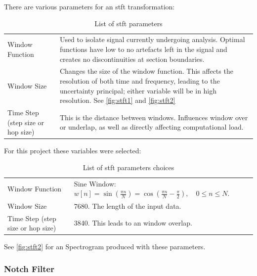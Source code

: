 \documentclass[12pt]{article}
\begin{document}
There are various parameters for an \acrshort{stft} transformation: 
\begin{table}[H]
\centering
\begin{tabular}{p{}p{}}
Window Function & Used to isolate signal currently undergoing analysis. Optimal functions have low to no artefacts left in the signal and creates no discontinuities at section boundaries.\\
Window Size & Changes the size of the window function. This affects the resolution of both time and frequency, leading to the uncertainty principal; either variable will be in high resolution. See \ref{fig:stft1} and \ref{fig:stft2} \\
Time Step (step size or hop size) & This is the distance between windows. Influences window over or underlap, as well as directly affecting computational load. \\                            
\end{tabular}
\caption{List of \acrfull{stft} parameters}
\label{tab:stft_params}
\end{table}

For this project these variables were selected:

\begin{table}[H]
\centering
\begin{tabular}{p{}p{}}
Window Function & Sine Window: $ w[n] = \sin\left(\frac{\pi n}{N}\right) = \cos\left(\frac{\pi n}{N} - \frac{\pi}{2}\right),\quad 0\le n \le N.$ \\
Window Size & 7680. The length of the input data. \\
Time Step (step size or hop size) & 3840. This leads to an window overlap. \\                            
\end{tabular}
\caption{List of \acrfull{stft} parameters choices}
\label{tab:stft_choices}
\end{table}

See \ref{fig:stft2} for an Spectrogram produced with these parameters. 

\subsubsection{Notch Filter}
\end{document}

